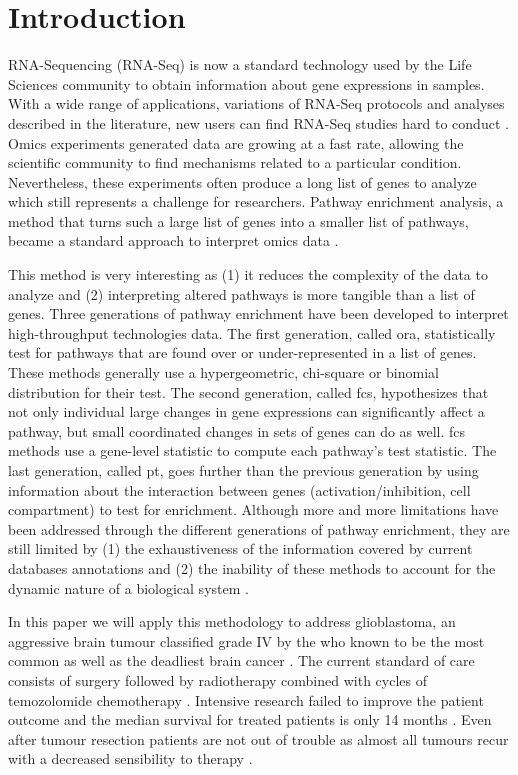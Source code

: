 \section{Introduction}

RNA-Sequencing (RNA-Seq) is now a standard technology used by the Life Sciences community to obtain information about gene expressions in samples.
With a wide range of applications, variations of RNA-Seq protocols and analyses described in the literature, new users can find RNA-Seq studies hard to conduct \cite*{Conesa2016}.
Omics experiments generated data are growing at a fast rate, allowing the scientific community to find mechanisms related to a particular condition.
Nevertheless, these experiments often produce a long list of genes to analyze which still represents a challenge for researchers. 
Pathway enrichment analysis, a method that turns such a large list of genes into a smaller list of pathways, became a standard approach to interpret omics data \cite*{Reimand2019}.

This method is very interesting as (1) it reduces the complexity of the data to analyze and (2) interpreting altered pathways is more tangible than a list of genes.
Three generations of pathway enrichment have been developed to interpret high-throughput technologies data.
The first generation, called \acrfull{ora}, statistically test for pathways that are found over or under-represented in a list of genes.
These methods generally use a hypergeometric, chi-square or binomial distribution for their test.
The second generation, called \acrfull{fcs}, hypothesizes that not only individual large changes in gene expressions can significantly affect a pathway, but small coordinated changes in sets of genes can do as well.
\acrshort{fcs} methods use a gene-level statistic to compute each pathway's test statistic.
The last generation, called \acrfull{pt}, goes further than the previous generation by using information about the interaction between genes (activation/inhibition, cell compartment) to test for enrichment.
Although more and more limitations have been addressed through the different generations of pathway enrichment, they are still limited by (1) the exhaustiveness of the information covered by current databases annotations and (2) the inability of these methods to account for the dynamic nature of a biological system \cite*{Khatri2012}.

In this paper we will apply this methodology to address glioblastoma, an aggressive brain tumour classified grade IV by the \acrfull{who} known to be the most common as well as the deadliest brain cancer \cite*{Quinones2018,Cheng2015}.
The current standard of care consists of surgery followed by radiotherapy combined with cycles of temozolomide chemotherapy \cite*{LeRhun2019}.
Intensive research failed to improve the patient outcome and the median survival for treated patients is only 14 months \cite*{Delgado-Lopez2016}.
Even after tumour resection patients are not out of trouble as almost all tumours recur with a decreased sensibility to therapy \cite*{Campos2016}.

